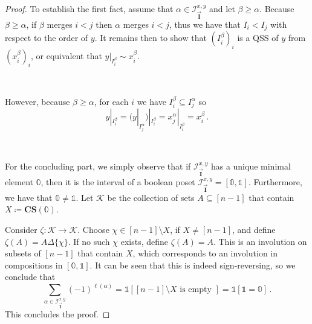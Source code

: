 \documentclass[12pt, reqno]{amsart}
\theoremstyle{definition}
\newcommand{\III}{\vec{\mathbf{I}}}
\begin{document}
\begin{proof}
To establish the first fact, assume that $\alpha \in \mathcal I^{x, y}_{\III}$ and let $\beta \geq \alpha $.
Because $\beta \geq \alpha$, if $\beta $ merges $i < j$ then $\alpha $ merges $i < j$, thus we have that $I_i < I_j$ with respect to the order of $y$.
It remains then to show that $(I^{\beta}_i)_i$ is a QSS of $y$ from $(x^{\beta}_i )_i$, or equivalent that $y|_{I_i^{\beta}} \sim x_i^{\beta}$.

\

However, because $\beta \geq \alpha$, for each $i$ we have $I^{\beta}_i \subseteq I^{\alpha}_j$ so 
\[y|_{I^{\beta}_i} = {\Big(}y|_{I^{\alpha}_j}{\Big )}|_{I^{\beta}_i} =x^{\alpha}_j |_{I^{\beta}_i} = x^{\beta}_i \, .\]

\

For the concluding part, we simply observe that if $\mathcal I^{x, y}_{\III}$ has a unique minimal element $\mathbb{0}$, then it is the interval of a boolean poset $\mathcal I^{x, y}_{\III} = [\mathbb{0}, \mathbb{1}]$.
Furthermore, we have that $\mathbb{0} \neq \mathbb{1}$.
Let $\mathcal K $ be the collection of sets $A \subseteq [n-1]$ that contain $X \coloneqq \mathbf{CS}(\mathbb{0})$.

Consider $\zeta: \mathcal K \to \mathcal K$.
Choose $\chi \in [n-1] \setminus X$, if $X \neq [n-1]$, and define $\zeta (A) = A \Delta \{ \chi \}$.
If no such $\chi $ exists, define $\zeta(A) = A$.
This is an involution on subsets of $[n-1]$ that contain $X$, which corresponds to an involution in compositions in $[\mathbb{0} , \mathbb{1}]$.
It can be seen that this is indeed sign-reversing, so we conclude that 
$$\sum_{\alpha \in \mathcal I^{x, y}_{\III}} (-1)^{\ell(\alpha)} =  \mathbb{1}[[n-1] \setminus X \text{ is empty } ] = \mathbb{1}[\mathbb{1} = \mathbb{0}] \, .$$
This concludes the proof.
\end{proof}


\end{document}
